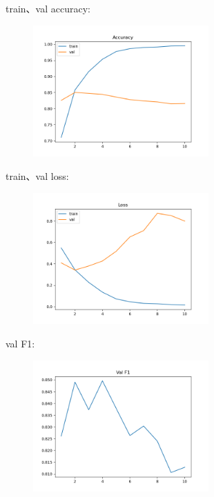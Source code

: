 \documentclass{article}
\begin{document}
train、val accuracy:
\begin{figure}[h]
    \centering
    \includegraphics[width=0.6\textwidth]{../results/gru_acc.png}
\end{figure}

\FloatBarrier

train、val loss:
\begin{figure}[h]
    \centering
    \includegraphics[width=0.6\textwidth]{../results/gru_loss.png}
\end{figure}

\FloatBarrier

val F1:
\begin{figure}[htbp]
    \centering
    \includegraphics[width=0.6\textwidth]{../results/gru_f1.png}
\end{figure}
\end{document}
